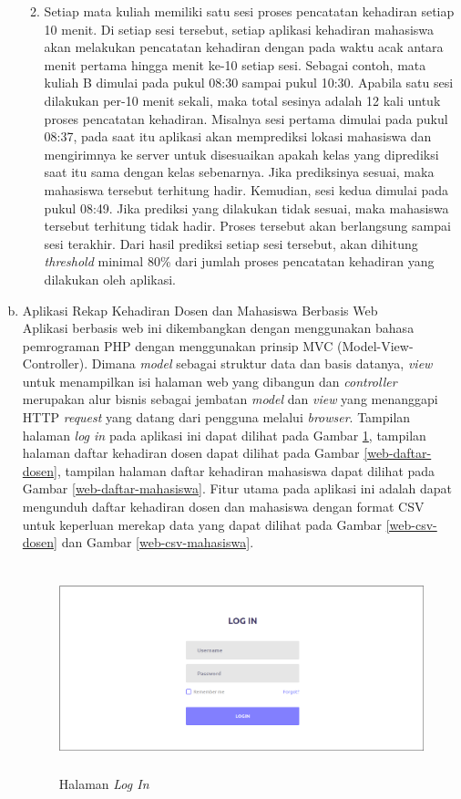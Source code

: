 \begin{enumerate}[a.]
\begin{enumerate}[1.]
		\vspace{2cm}
		\item Setiap mata kuliah memiliki satu sesi proses pencatatan kehadiran setiap 10 menit. Di setiap sesi tersebut, setiap aplikasi kehadiran mahasiswa akan melakukan pencatatan kehadiran dengan pada waktu acak antara menit pertama hingga menit ke-10 setiap sesi. Sebagai contoh, mata kuliah B dimulai pada pukul 08:30 sampai pukul 10:30. Apabila satu sesi dilakukan per-10 menit sekali, maka total sesinya adalah 12 kali untuk proses pencatatan kehadiran. Misalnya sesi pertama dimulai pada pukul 08:37, pada saat itu aplikasi akan memprediksi lokasi mahasiswa dan mengirimnya ke server untuk disesuaikan apakah kelas yang diprediksi saat itu sama dengan kelas sebenarnya. Jika prediksinya sesuai, maka mahasiswa tersebut terhitung hadir. Kemudian, sesi kedua dimulai pada pukul 08:49. Jika prediksi yang dilakukan tidak sesuai, maka mahasiswa tersebut terhitung tidak hadir. Proses tersebut akan berlangsung sampai sesi terakhir. Dari hasil prediksi setiap sesi tersebut, akan dihitung \textit{threshold} minimal 80\% dari jumlah proses pencatatan kehadiran yang dilakukan oleh aplikasi.
		\end{enumerate}

	\item Aplikasi Rekap Kehadiran Dosen dan Mahasiswa Berbasis Web
	\\
	Aplikasi berbasis web ini dikembangkan dengan menggunakan bahasa pemrograman PHP dengan menggunakan prinsip MVC (Model-View-Controller). Dimana \textit{model} sebagai struktur data dan basis datanya, \textit{view} untuk menampilkan isi halaman web yang dibangun dan \textit{controller} merupakan alur bisnis sebagai jembatan \textit{model} dan \textit{view} yang menanggapi HTTP \textit{request} yang datang dari pengguna melalui \textit{browser}. Tampilan halaman \textit{log in} pada aplikasi ini dapat dilihat pada Gambar \ref{web-login}, tampilan halaman daftar kehadiran dosen dapat dilihat pada Gambar \ref{web-daftar-dosen}, tampilan halaman daftar kehadiran mahasiswa dapat dilihat pada Gambar \ref{web-daftar-mahasiswa}. Fitur utama pada aplikasi ini adalah dapat mengunduh daftar kehadiran dosen dan mahasiswa dengan format CSV untuk keperluan merekap data yang dapat dilihat pada Gambar \ref{web-csv-dosen} dan Gambar \ref{web-csv-mahasiswa}.  
	\vspace{-0.2cm}
		\begin{figure}[H]
		\center
		\includegraphics [width = 13cm, height= 6cm]{gambar/web/login}
		\caption{Halaman \textit{Log In}}
		\label{web-login}
		\end{figure}
		

\end{enumerate}
